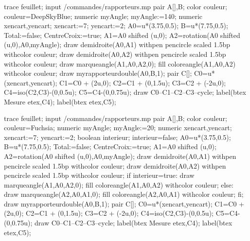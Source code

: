 \begin{exercice*}
   \begin{Geometrie}[CoinHD={(9.5u,4.5u)}]
      trace feuillet;
      input \persopath/commandes/rapporteurs.mp
      pair A[],B;
      color couleur;
      couleur=DeepSkyBlue;
      numeric myAngle;
      myAngle:=140;
      numeric xencart,yencart;
      xencart:=7;
      yencart:=2;
      A0=u*(3.75,0.5);
      B=u*(7.75,0.5);
      Total:=false;%
      CentreCroix:=true;%
      A1=A0 shifted (u,0); 
      A2=rotation(A0 shifted (u,0),A0,myAngle);           
      draw demidroite(A0,A1) withpen pencircle scaled 1.5bp withcolor couleur;
      draw demidroite(A0,A2) withpen pencircle scaled 1.5bp withcolor couleur;
      draw marqueangle(A1,A0,A2,0);
      fill coloreangle(A1,A0,A2) withcolor couleur;
      draw myrapporteurdouble(A0,B,1);
      pair C[];
      C0=u*(xencart,yencart);
      C1=C0 + (2u,0); 
      C2=C1 + (0,1.5u);
      C3=C2 + (-2u,0);
      C4=iso(C2,C3)-(0,0.5u);
      C5=C4-(0,0.75u);
      draw C0--C1--C2--C3--cycle;
      label(btex Mesure etex,C4);
      label(btex \makebox[0.2\linewidth]{\dotfill} etex,C5);      
   \end{Geometrie}

   \begin{Geometrie}[CoinHD={(9.5u,4.5u)}]
      trace feuillet;
      input \persopath/commandes/rapporteurs.mp
      pair A[],B;
      color couleur;
      couleur=Fuchsia;
      numeric myAngle;
      myAngle:=20;
      numeric xencart,yencart;
      xencart:=7;
      yencart:=2;
      boolean interieur;
      interieur=false;
      A0=u*(3.75,0.5);
      B=u*(7.75,0.5);
      Total:=false;%
      CentreCroix:=true;%
      A1=A0 shifted (u,0); 
      A2=rotation(A0 shifted (u,0),A0,myAngle);           
      draw demidroite(A0,A1) withpen pencircle scaled 1.5bp withcolor couleur;
      draw demidroite(A0,A2) withpen pencircle scaled 1.5bp withcolor couleur;
      if interieur=true:
         draw marqueangle(A1,A0,A2,0);
         fill coloreangle(A1,A0,A2) withcolor couleur;
      else:
         draw marqueangle(A2,A0,A1,0);
         fill coloreangle(A2,A0,A1) withcolor couleur;
      fi;
      draw myrapporteurdouble(A0,B,1);
      pair C[];
      C0=u*(xencart,yencart);
      C1=C0 + (2u,0); 
      C2=C1 + (0,1.5u);
      C3=C2 + (-2u,0);
      C4=iso(C2,C3)-(0,0.5u);
      C5=C4-(0,0.75u);
      draw C0--C1--C2--C3--cycle;
      label(btex Mesure etex,C4);
      label(btex \makebox[0.2\linewidth]{\dotfill} etex,C5);      
   \end{Geometrie}
\end{exercice*}